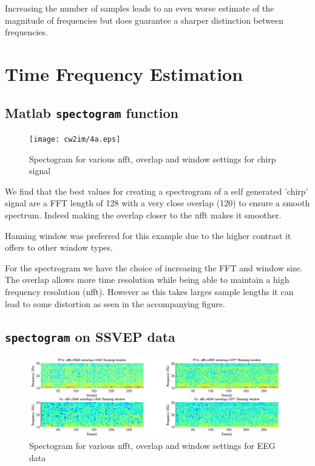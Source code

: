\documentclass[10pt,twoside,a4paper]{report}
\begin{document}
Increasing the number of samples leads to an even worse estimate of the magnitude of frequencies but does guarantee a sharper distinction between frequencies.

\section{Time Frequency Estimation}

\subsection{Matlab \texttt{spectogram} function}



\begin{figure}[h!]
 \centering
 \texttt{[image: cw2im/4a.eps]}
 \caption{Spectogram for various nfft, overlap and window settings for chirp signal}
 \label{fig:2_4a}
\end{figure}


We find that the best values for creating a spectrogram of a self generated 'chirp' signal are a FFT length of 128 with a very close overlap (120) to ensure a smooth spectrum. Indeed making the overlap closer to the nfft makes it smoother.

Hanning window was preferred for this example due to the higher contrast it offers to other window types.

For the spectrogram we have the choice of increasing the FFT and window size. The overlap allows more time resolution while being able to maintain a high frequency resolution (nfft). However as this takes larges sample lengths it can lead to some distortion as seen in the accompanying figure. 

\subsection{\texttt{spectogram} on SSVEP data}

\begin{figure}[h!]
 \centering
 \includegraphics[width=\textwidth]{cw2im/4b.png}
 \caption{Spectogram for various nfft, overlap and window settings for EEG data}
 \label{fig:2_4b}
\end{figure}
\end{document}
